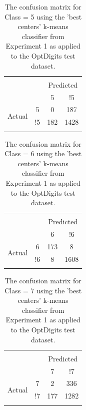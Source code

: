 \documentclass[12pt]{article}
\begin{document}
\begin{table} \centering 
  \caption{The confusion matrix for Class = 5 using the 'best centers' k-means classifier from Experiment 1 as applied to the OptDigits test dataset.} 
  \label{tab:a8} 
\begin{tabular}{lccc} 
\\[-1.8ex]\hline 
\hline \\[-1.8ex] 
\multicolumn{2}{c}{} & \multicolumn{2}{c}{Predicted} \\
\multicolumn{2}{c}{} & 5 & !5\\
\multirow{2}{*}{Actual} & 5 & 0 & 187\\
& !5 & 182 & 1428\\
\hline \\[-1.8ex]
\end{tabular} 
\end{table}

\begin{table} \centering 
  \caption{The confusion matrix for Class = 6 using the 'best centers' k-means classifier from Experiment 1 as applied to the OptDigits test dataset.} 
  \label{tab:a9} 
\begin{tabular}{lccc} 
\\[-1.8ex]\hline 
\hline \\[-1.8ex] 
\multicolumn{2}{c}{} & \multicolumn{2}{c}{Predicted} \\
\multicolumn{2}{c}{} & 6 & !6\\
\multirow{2}{*}{Actual} & 6 & 173 & 8\\
& !6 & 8 & 1608\\
\hline \\[-1.8ex]
\end{tabular} 
\end{table}

\begin{table} \centering 
  \caption{The confusion matrix for Class = 7 using the 'best centers' k-means classifier from Experiment 1 as applied to the OptDigits test dataset.} 
  \label{tab:a10} 
\begin{tabular}{lccc} 
\\[-1.8ex]\hline 
\hline \\[-1.8ex] 
\multicolumn{2}{c}{} & \multicolumn{2}{c}{Predicted} \\
\multicolumn{2}{c}{} & 7 & !7\\
\multirow{2}{*}{Actual} & 7 & 2 & 336\\
& !7 & 177 & 1282\\
\hline \\[-1.8ex]
\end{tabular} 
\end{table}
\end{document}
